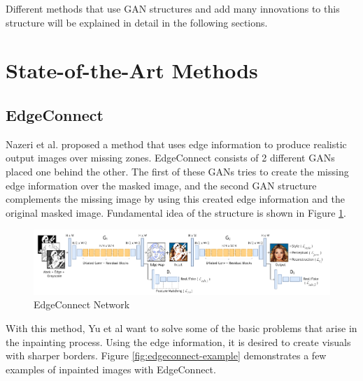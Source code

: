 Different methods that use GAN structures and add many innovations to this structure will be explained in detail in the following sections.

\newpage
\section{State-of-the-Art Methods}

\subsection{EdgeConnect}

Nazeri et al. proposed a method \cite{edgeconnect} that uses edge information to produce realistic output images over missing zones.  EdgeConnect consists of 2 different GANs placed one behind the other. The first of these GANs tries to create the missing edge information over the masked image, and the second GAN structure complements the missing image by using this created edge information and the original masked image. Fundamental idea of the structure is shown in Figure \ref{fig:edgeconnect-network}.

\begin{figure}[h]
    \centering
    \includegraphics[scale=0.6]{figures/chapter4/EdgeConnect.PNG}
    \vspace*{5mm}
    \caption{EdgeConnect Network \cite{edgeconnect}}
    \label{fig:edgeconnect-network}
\end{figure}

With this method, Yu et al want to solve some of the basic problems that arise in the inpainting process. Using the edge information, it is desired to create visuals with sharper borders. Figure \ref{fig:edgeconnect-example} demonstrates a few examples of inpainted images with EdgeConnect.

